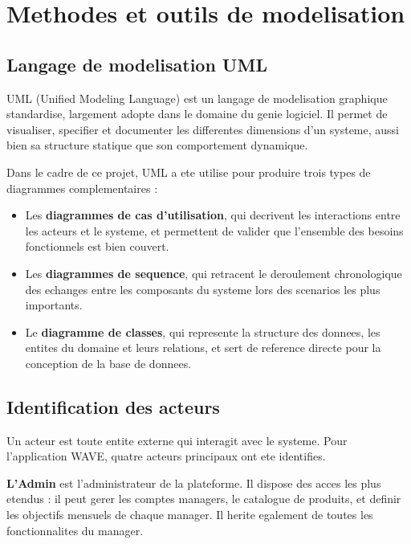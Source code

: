 \section{Methodes et outils de modelisation}

\subsection{Langage de modelisation UML}

UML (Unified Modeling Language) est un langage de modelisation graphique
standardise, largement adopte dans le domaine du genie logiciel. Il permet
de visualiser, specifier et documenter les differentes dimensions d'un
systeme, aussi bien sa structure statique que son comportement dynamique.

Dans le cadre de ce projet, UML a ete utilise pour produire trois types
de diagrammes complementaires :

\begin{itemize}
  \item Les \textbf{diagrammes de cas d'utilisation}, qui decrivent les
        interactions entre les acteurs et le systeme, et permettent de
        valider que l'ensemble des besoins fonctionnels est bien couvert.
  \item Les \textbf{diagrammes de sequence}, qui retracent le deroulement
        chronologique des echanges entre les composants du systeme lors
        des scenarios les plus importants.
  \item Le \textbf{diagramme de classes}, qui represente la structure des
        donnees, les entites du domaine et leurs relations, et sert de
        reference directe pour la conception de la base de donnees.
\end{itemize}

\subsection{Identification des acteurs}

Un acteur est toute entite externe qui interagit avec le systeme. Pour
l'application WAVE, quatre acteurs principaux ont ete identifies.

\textbf{L'Admin} est l'administrateur de la plateforme. Il dispose des
acces les plus etendus : il peut gerer les comptes managers, le catalogue
de produits, et definir les objectifs mensuels de chaque manager. Il herite
egalement de toutes les fonctionnalites du manager.

